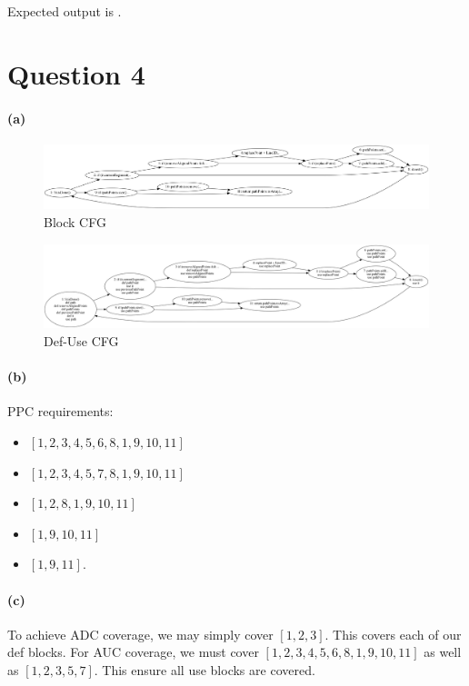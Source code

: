 \documentclass[12pt]{article}
\begin{document}
Expected output is \rmfamily{}.

\section*{Question 4}
\paragraph{(a)}
\begin{figure}[htb]
  \begin{center}
    \includegraphics[width=\textwidth]{blockCFG}
  \end{center}
  \caption{Block CFG}
\end{figure}

\begin{figure}[htb]
  \begin{center}
    \includegraphics[width=\textwidth]{defuseCFG}
  \end{center}
  \caption{Def-Use CFG}
\end{figure}

\paragraph{(b)} PPC requirements:
\begin{itemize}
\item $[1, 2, 3, 4, 5, 6, 8, 1, 9, 10, 11]$
\item $[1, 2, 3, 4, 5, 7, 8, 1, 9, 10, 11]$
\item $[1, 2, 8, 1, 9, 10, 11]$
\item $[1, 9, 10, 11]$
\item $[1, 9, 11]$.
\end{itemize}

\paragraph{(c)} To achieve ADC coverage, we may simply cover $[1, 2, 3]$. This covers each of our def blocks. For AUC coverage, we must cover $[1, 2, 3, 4, 5, 6, 8, 1, 9, 10, 11]$ as well as $[1, 2, 3, 5, 7]$. This ensure all use blocks are covered.
\end{document}
